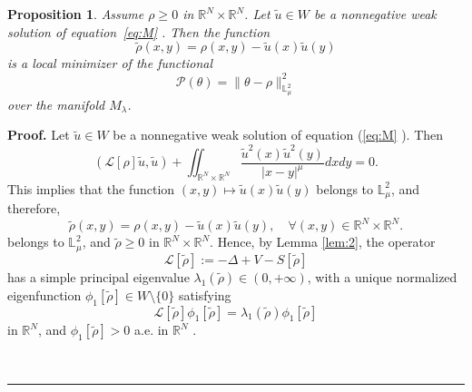 \documentclass[12pt,thmsa]{article}
\newtheorem{proposition}[theorem]{Proposition}
\newenvironment{proof}[1][Proof]{\noindent\textbf{#1.} }{\ \rule{0.5em}{0.5em}}
\begin{document}
\begin{proposition}
\label{Prop:4} Assume $\rho \geq 0$ in $\mathbb{R}^N\times \mathbb{R}^N$.
Let $\tilde{u} \in W$ be a nonnegative weak solution of equation~\eqref{eq:M}%
. Then the function
\begin{equation*}
\tilde{\rho}(x,y) = \rho(x,y) - \tilde{u}(x)\tilde{u}(y)
\end{equation*}
is a local minimizer of the functional
\begin{equation*}
\mathcal{P}(\theta) = \|\theta - \rho\|_{\mathbb{L}_{\mu}^{2}}^{2}
\end{equation*}
over the manifold $M_{\lambda}$.
\end{proposition}

\begin{proof}
Let $\tilde{u}\in W$ be a nonnegative weak solution of equation (\ref{eq:M}%
). Then
\begin{equation*}
(\mathcal{L}[\rho ]\tilde{u},\tilde{u})+\iint_{\mathbb{R}^{N}\times \mathbb{R%
}^{N}}\frac{\tilde{u}^{2}(x)\tilde{u}^{2}(y)}{|x-y|^{\mu }}dxdy=0.
\end{equation*}%
This implies that the function $(x,y)\mapsto \tilde{u}(x)\tilde{u}(y)$
belongs to $\mathbb{L}_{\mu }^{2}$, and therefore,
\begin{equation*}
\tilde{\rho}(x,y)=\rho (x,y)-\tilde{u}(x)\tilde{u}(y),\quad \forall (x,y)\in
\mathbb{R}^{N}\times \mathbb{R}^{N}.
\end{equation*}%
belongs to $\mathbb{L}_{\mu }^{2}$, and $\tilde{\rho}\geq 0$ in $\mathbb{R}%
^{N}\times \mathbb{R}^{N}$. Hence, by Lemma \ref{lem:2}, the operator
\begin{equation*}
\mathcal{L}[\tilde{\rho}]:=-\Delta +V-S[\tilde{\rho}]
\end{equation*}%
has a simple principal eigenvalue $\lambda _{1}(\tilde{\rho})\in (0,+\infty
) $, with a unique normalized eigenfunction $\phi _{1}[\tilde{\rho}]\in
W\setminus \{0\}$ satisfying
\begin{equation}
\mathcal{L}[\tilde{\rho}]\phi _{1}[\tilde{\rho}]=\lambda _{1}(\tilde{\rho}%
)\phi _{1}[\tilde{\rho}]  \label{eq:eigentild}
\end{equation}%
in $\mathbb{R}^{N}$, and $\phi _{1}[\tilde{\rho}]>0$ a.e. in $\mathbb{R}^{N}$%
.


\end{proof}
\end{document}
